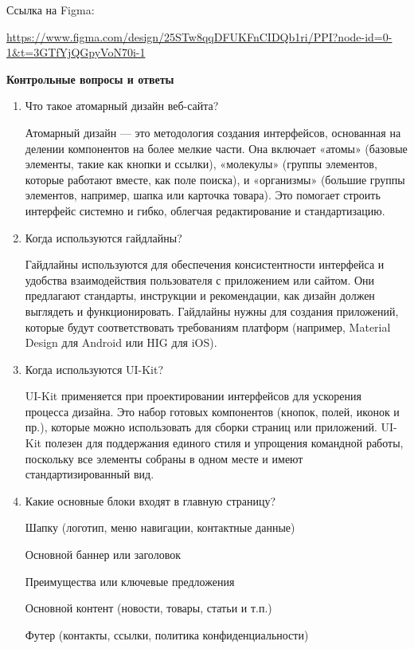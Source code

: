 Ссылка на Figma:

\url{https://www.figma.com/design/25STw8qqDFUKFnCIDQb1ri/PPI?node-id=0-1&t=3GTfYjQGpyVoN70i-1}
\bigskip

\textbf{Контрольные вопросы и ответы}

\begin{enumerate}
    \item Что такое атомарный дизайн веб-сайта?

    Атомарный дизайн — это методология создания интерфейсов, основанная на делении компонентов на более мелкие части. Она включает «атомы» (базовые элементы, такие как кнопки и ссылки), «молекулы» (группы элементов, которые работают вместе, как поле поиска), и «организмы» (большие группы элементов, например, шапка или карточка товара). Это помогает строить интерфейс системно и гибко, облегчая редактирование и стандартизацию.

\item Когда используются гайдлайны?

    Гайдлайны используются для обеспечения консистентности интерфейса и удобства взаимодействия пользователя с приложением или сайтом. Они предлагают стандарты, инструкции и рекомендации, как дизайн должен выглядеть и функционировать. Гайдлайны нужны для создания приложений, которые будут соответствовать требованиям платформ (например, Material Design для Android или HIG для iOS).

\item Когда используются UI-Kit?

    UI-Kit применяется при проектировании интерфейсов для ускорения процесса дизайна. Это набор готовых компонентов (кнопок, полей, иконок и пр.), которые можно использовать для сборки страниц или приложений. UI-Kit полезен для поддержания единого стиля и упрощения командной работы, поскольку все элементы собраны в одном месте и имеют стандартизированный вид.

\item Какие основные блоки входят в главную страницу?

        Шапку (логотип, меню навигации, контактные данные)

        Основной баннер или заголовок

        Преимущества или ключевые предложения

        Основной контент (новости, товары, статьи и т.п.)

        Футер (контакты, ссылки, политика конфиденциальности)


\end{enumerate}
